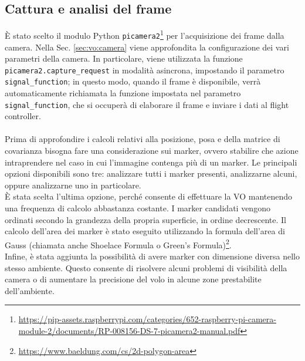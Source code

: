 \subsection{Cattura e analisi del frame}
\label{sec:vo:cattura_frame}
È stato scelto il modulo Python \texttt{picamera2}\footnote{\url{https://pip-assets.raspberrypi.com/categories/652-raspberry-pi-camera-module-2/documents/RP-008156-DS-7-picamera2-manual.pdf}} per l'acquisizione dei frame dalla camera. Nella Sec. \ref{sec:vo:camera} viene approfondita la configurazione dei vari parametri della camera. In particolare, viene utilizzata la funzione \texttt{picamera2.capture\_request} in modalità asincrona, impostando il parametro \texttt{signal\_function}; in questo modo, quando il frame è disponibile, verrà automaticamente richiamata la funzione impostata nel parametro \texttt{signal\_function}, che si occuperà di elaborare il frame e inviare i dati al flight controller. \\ \\
Prima di approfondire i calcoli relativi alla posizione, posa e della matrice di covarianza bisogna fare una considerazione sui marker, ovvero stabilire che azione intraprendere nel caso in cui l'immagine contenga più di un marker. Le principali opzioni disponibili sono tre: analizzare tutti i marker presenti, analizzarne alcuni, oppure analizzarne uno in particolare. \\
È stata scelta l'ultima opzione, perché consente di effettuare la VO mantenendo una frequenza di calcolo abbastanza costante. I marker candidati vengono ordinati secondo la grandezza della propria superficie, in ordine decrescente. Il calcolo dell'area dei marker è stato eseguito utilizzando la formula dell'area di Gauss (chiamata anche Shoelace Formula o Green’s Formula)\footnote{\url{https://www.baeldung.com/cs/2d-polygon-area}}. \\
Infine, è stata aggiunta la possibilità di avere marker con dimensione diversa nello stesso ambiente. Questo consente di risolvere alcuni problemi di visibilità della camera o di aumentare la precisione del volo in alcune zone prestabilite dell'ambiente.

